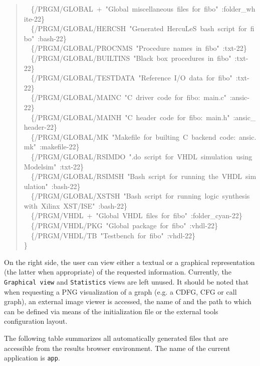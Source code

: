 \documentclass[a4paper]{article}
\begin{document}
\begin{quote}
{~~\{/PRGM/GLOBAL~+~"Global~miscellaneous~files~for~fibo"~:folder\_white-22\}\\
~~\{/PRGM/GLOBAL/HERCSH~"Generated~HercuLeS~bash~script~for~fibo"~:bash-22\}\\
~~\{/PRGM/GLOBAL/PROCNMS~"Procedure~names~in~fibo"~:txt-22\}\\
~~\{/PRGM/GLOBAL/BUILTINS~"Black~box~procedures~in~fibo"~:txt-22\}\\
~~\{/PRGM/GLOBAL/TESTDATA~"Reference~I/O~data~for~fibo"~:txt-22\}\\
~~\{/PRGM/GLOBAL/MAINC~"C~driver~code~for~fibo:~main.c"~:ansic-22\}\\
~~\{/PRGM/GLOBAL/MAINH~"C~header~code~for~fibo:~main.h"~:ansic\_header-22\}\\
~~\{/PRGM/GLOBAL/MK~"Makefile~for~builting~C~backend~code:~ansic.mk"~:makefile-22\}\\
~~\{/PRGM/GLOBAL/RSIMDO~".do~script~for~VHDL~simulation~using~Modelsim"~:txt-22\}\\
~~\{/PRGM/GLOBAL/RSIMSH~"Bash~script~for~running~the~VHDL~simulation"~:bash-22\}\\
~~\{/PRGM/GLOBAL/XSTSH~"Bash~script~for~running~logic~synthesis~with~Xilinx~XST/ISE"~:bash-22\}\\
~~\{/PRGM/VHDL~+~"Global~VHDL~files~for~fibo"~:folder\_cyan-22\}\\
~~\{/PRGM/VHDL/PKG~"Global~package~for~fibo"~:vhdl-22\}\\
~~\{/PRGM/VHDL/TB~"Testbench~for~fibo"~:vhdl-22\}\\
\}
}
\end{quote}

On the right side, the user can view either a textual or a graphical representation (the latter when appropriate) of the requested information. Currently, the \texttt{Graphical view} and \texttt{Statistics} views are left unused. It should be noted that when requesting a PNG visualization of a graph (e.g. a CDFG, CFG or call graph), an external image viewer is accessed, the name of and the path to which can be defined via means of the initialization file or the external tools configuration layout.

The following table summarizes all automatically generated files that are accessible from the results browser environment. The name of the current application is \texttt{app}.
\end{document}
